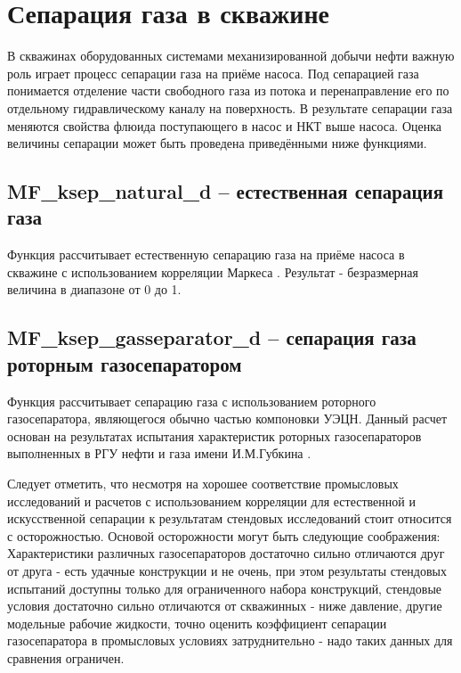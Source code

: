 \section{Сепарация газа в скважине}

В скважинах оборудованных системами механизированной добычи нефти важную роль играет процесс сепарации газа на приёме насоса. Под сепарацией газа понимается отделение части свободного газа из потока и перенаправление его по отдельному гидравлическому каналу на поверхность. В результате сепарации газа меняются свойства флюида поступающего в насос и НКТ выше насоса. Оценка величины сепарации может быть проведена приведёнными ниже функциями.

\subsection{MF\_ksep\_natural\_d – естественная сепарация газа}

Функция рассчитывает естественную сепарацию газа на приёме насоса в скважине с использованием корреляции Маркеса \cite{Marquez_2003} . Результат - безразмерная величина в диапазоне от 0 до 1. 



\subsection{MF\_ksep\_gasseparator\_d – сепарация газа роторным газосепаратором}

Функция рассчитывает сепарацию газа с использованием роторного газосепаратора, являющегося обычно частью компоновки УЭЦН. Данный расчет основан на результатах испытания характеристик роторных газосепараторов выполненных в РГУ нефти и газа имени И.М.Губкина \cite{SPE_117415_2008}. 

Следует отметить, что несмотря на хорошее соответствие промысловых исследований и расчетов с использованием корреляции для естественной и искусственной сепарации \cite{SPE_117415_2008} к результатам стендовых исследований стоит относится с осторожностью. Основой осторожности могут быть следующие соображения: Характеристики различных газосепараторов достаточно сильно отличаются друг от друга - есть удачные конструкции и не очень, при этом результаты стендовых испытаний доступны только для ограниченного набора конструкций, стендовые условия достаточно сильно отличаются от скважинных - ниже давление, другие модельные рабочие жидкости, точно оценить коэффициент сепарации газосепаратора в промысловых условиях затруднительно - надо таких данных для сравнения ограничен. 

